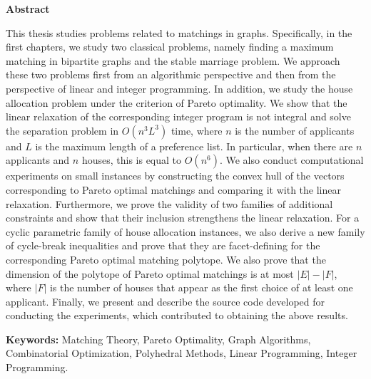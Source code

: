 \clearpage

\begin{center}
{\Large \textbf{Abstract}}
\end{center}

\vspace{1cm}

This thesis studies problems related to matchings in graphs. Specifically, in the first chapters, we study two classical problems, namely finding a maximum matching in bipartite graphs and the stable marriage problem. We approach these two problems first from an algorithmic perspective and then from the perspective of linear and integer programming. In addition, we study the house allocation problem under the criterion of Pareto optimality. We show that the linear relaxation of the corresponding integer program is not integral and solve the separation problem in $O(n^{3}L^{3})$ time, where $n$ is the number of applicants and $L$ is the maximum length of a preference list. In particular, when there are $n$ applicants and $n$ houses, this is equal to $O(n^{6})$. We also conduct computational experiments on small instances by constructing the convex hull of the vectors corresponding to Pareto optimal matchings and comparing it with the linear relaxation. Furthermore, we prove the validity of two families of additional constraints and show that their inclusion strengthens the linear relaxation. For a cyclic parametric family of house allocation instances, we also derive a new family of cycle-break inequalities and prove that they are facet-defining for the corresponding Pareto optimal matching polytope. We also prove that the dimension of the polytope of Pareto optimal matchings is at most $|E|-|F|$, where $|F|$ is the number of houses that appear as the first choice of at least one applicant. Finally, we present and describe the source code developed for conducting the experiments, which contributed to obtaining the above results.

\vspace{2em}
\noindent

\textbf{Keywords:} Matching Theory, Pareto Optimality, Graph Algorithms, Combinatorial Optimization, Polyhedral Methods, Linear Programming, Integer Programming.

\clearpage